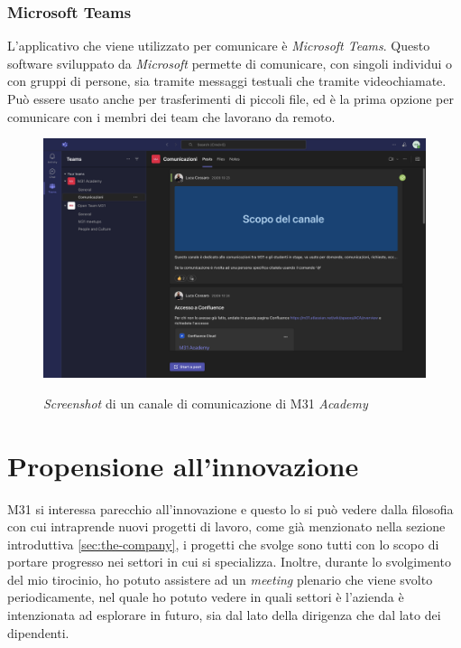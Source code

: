 \subsubsection*{Microsoft Teams}\noindent
L'applicativo che viene utilizzato per comunicare è \textit{Microsoft Teams}. Questo software sviluppato da \textit{Microsoft} permette di comunicare, con singoli individui o con gruppi di persone, sia tramite messaggi testuali che tramite videochiamate.
Può essere usato anche per trasferimenti di piccoli file, ed è la prima opzione per comunicare con i membri dei team che lavorano da remoto.
\begin{figure}[H]
    \centering
    \includegraphics[alt={\textit{Screenshot} di un canale di comunicazione di M31 \textit{Academy}}, width=0.9\columnwidth]{img/microsoft-teams.png}
    \caption{\textit{Screenshot} di un canale di comunicazione di M31 \textit{Academy}}
    \label{fig:teams}
\end{figure}

\section{Propensione all'innovazione}\noindent
M31 si interessa parecchio all'innovazione e questo lo si può vedere dalla filosofia con cui intraprende nuovi progetti di lavoro, come già menzionato nella sezione introduttiva \ref{sec:the-company}, i progetti che svolge sono tutti con lo scopo di portare progresso nei settori in cui si specializza.
Inoltre, durante lo svolgimento del mio tirocinio, ho potuto assistere ad un \textit{meeting} plenario che viene svolto periodicamente, nel quale ho potuto vedere in quali settori è l'azienda è intenzionata ad esplorare in futuro, sia dal lato della dirigenza che dal lato dei dipendenti.